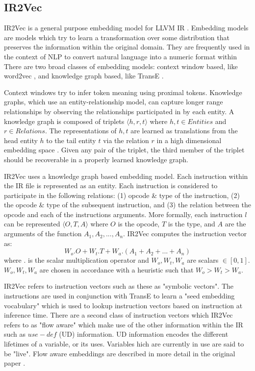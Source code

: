 \documentclass[nohyperref]{article}
\theoremstyle{plain}
\theoremstyle{definition}
\theoremstyle{remark}
\begin{document}
\subsection{IR2Vec}
IR2Vec is a general purpose embedding model for LLVM IR \cite{ir2vec}. Embedding models are models which try to learn a transformation over some distribution that preserves the information within the original domain. They are frequently used in the context of NLP to convert natural language into a numeric format within There are two broad classes of embedding models: context window based, like word2vec \cite{word2vec}, and knowledge graph based, like TransE \cite{transE}. 

Context windows try to infer token meaning using proximal tokens. Knowledge graphs, which use an entity-relationship model, can capture longer range relationships by observing the relationships participated in by each entity. A knowledge graph is composed of triplets $\langle h, r, t \rangle$ where $h, t \in Entities$ and $r \in Relations$. The representations of $h, t$ are learned as translations from the head entity $h$ to the tail entity $t$ via the relation $r$ in a high dimensional embedding space \cite{ir2vec}. Given any pair of the triplet, the third member of the triplet should be recoverable in a properly learned knowledge graph.


IR2Vec uses a knowledge graph based embedding model. Each instruction within the IR file is represented as an entity. Each instruction is considered to participate in the following relations: (1) opcode \& type of the instruction, (2) the opcode \& type of the subsequent instruction, and (3) the relation between the opcode and each of the instructions arguments. More formally, each instruction $l$ can be represented $\langle O, T, A \rangle$ where $O$ is the opcode, $T$ is the type, and $A$ are the arguments of the function $A_1, A_2, ..., A_n$. IR2Vec computes the instruction vector as:
\begin{equation}\label{eq:ir2vec-inst-vec}
    W_o.O + W_t.T + W_a.(A_1 + A_2 + ... + A_n)
\end{equation}
where $.$ is the scalar multiplication operator and $W_o, W_t, W_a$ are scalars $\in [0, 1]$. $W_o, W_t, W_a$ are chosen in accordance with a heuristic such that $W_o > W_t > W_a$.

IR2Vec refers to instruction vectors such as these as "symbolic vectors". The instructions are used in conjunction with TransE to learn a "seed embedding vocabulary" which is used to lookup instruction vectors based on instruction at inference time. There are a second class of instruction vectors which IR2Vec refers to as "flow aware" which make use of the other information within the IR such as $use-def$ (UD) information. UD information encodes the different lifetimes of a variable, or its uses. Variables hich are currently in use are said to be "live". Flow aware embeddings are described in more detail in the original paper \cite{ir2vec}.
\end{document}

